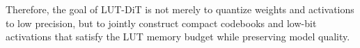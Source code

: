 Therefore, the goal of LUT-DiT is not merely to quantize weights and activations to low precision, but to jointly construct compact codebooks and low-bit activations that satisfy the LUT memory budget while preserving model quality.






